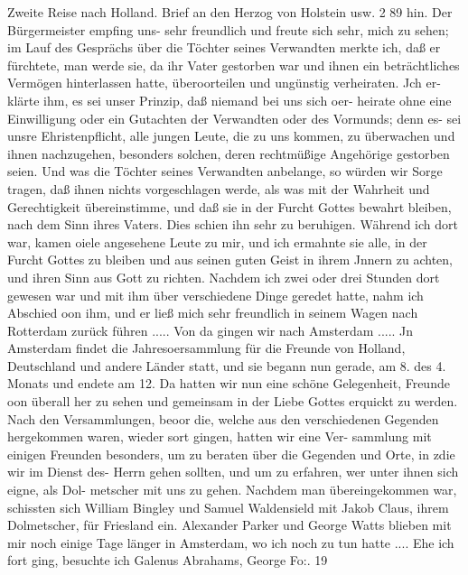 Zweite Reise nach Holland. Brief an den Herzog von Holstein usw. 2 89
hin. Der Bürgermeister empfing uns- sehr freundlich und freute
sich sehr, mich zu sehen; im Lauf des Gesprächs über die Töchter
seines Verwandten merkte ich, daß er fürchtete, man werde sie,
da ihr Vater gestorben war und ihnen ein beträchtliches Vermögen
hinterlassen hatte, überoorteilen und ungünstig verheiraten. Jch er-
klärte ihm, es sei unser Prinzip, daß niemand bei uns sich oer-
heirate ohne eine Einwilligung oder ein Gutachten der Verwandten
oder des Vormunds; denn es- sei unsre Ehristenpflicht, alle jungen
Leute, die zu uns kommen, zu überwachen und ihnen nachzugehen,
besonders solchen, deren rechtmüßige Angehörige gestorben seien.
Und was die Töchter seines Verwandten anbelange, so würden
wir Sorge tragen, daß ihnen nichts vorgeschlagen werde, als was
mit der Wahrheit und Gerechtigkeit übereinstimme, und daß sie
in der Furcht Gottes bewahrt bleiben, nach dem Sinn ihres
Vaters. Dies schien ihn sehr zu beruhigen. Während ich dort
war, kamen oiele angesehene Leute zu mir, und ich ermahnte sie
alle, in der Furcht Gottes zu bleiben und aus seinen guten Geist
in ihrem Jnnern zu achten, und ihren Sinn aus Gott zu richten.
Nachdem ich zwei oder drei Stunden dort gewesen war und mit
ihm über verschiedene Dinge geredet hatte, nahm ich Abschied oon
ihm, und er ließ mich sehr freundlich in seinem Wagen nach
Rotterdam zurück führen .....
Von da gingen wir nach Amsterdam ..... Jn Amsterdam
findet die Jahresoersammlung für die Freunde von Holland,
Deutschland und andere Länder statt, und sie begann nun gerade,
am 8. des 4. Monats und endete am 12. Da hatten wir nun
eine schöne Gelegenheit, Freunde oon überall her zu sehen und
gemeinsam in der Liebe Gottes erquickt zu werden. Nach den
Versammlungen, beoor die, welche aus den verschiedenen Gegenden
hergekommen waren, wieder sort gingen, hatten wir eine Ver-
sammlung mit einigen Freunden besonders, um zu beraten über
die Gegenden und Orte, in zdie wir im Dienst des- Herrn gehen
sollten, und um zu erfahren, wer unter ihnen sich eigne, als Dol-
metscher mit uns zu gehen. Nachdem man übereingekommen war,
schissten sich William Bingley und Samuel Waldensield mit Jakob
Claus, ihrem Dolmetscher, für Friesland ein.
Alexander Parker und George Watts blieben mit mir
noch einige Tage länger in Amsterdam, wo ich noch zu tun
hatte .... Ehe ich fort ging, besuchte ich Galenus Abrahams,
George Fo:. 19

